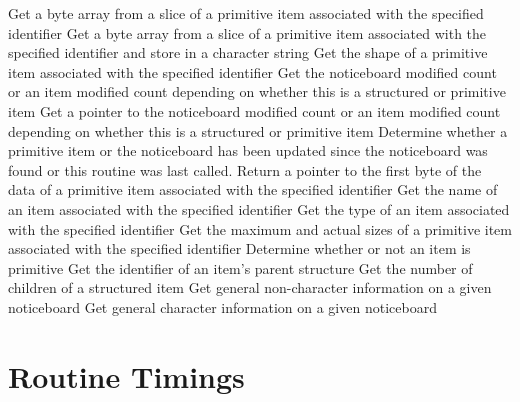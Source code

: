 \begin{mansectionroutines}
      Get a byte array from a slice of a primitive item
      associated with the specified identifier
      Get a byte array from a slice of a primitive item
      associated with the specified identifier and
      store in a character string
      Get the shape of a primitive item
      associated with the specified identifier
      Get the noticeboard modified count or an item modified count
      depending on whether this is a structured or primitive item
      Get a pointer to the noticeboard modified count or an item modified count
      depending on whether this is a structured or primitive item
      Determine whether a primitive item or the noticeboard has been updated
      since the noticeboard was found or this routine was last called.
      Return a pointer to the first byte of the data of a primitive item
      associated with the specified identifier
      Get the name of an item
      associated with the specified identifier
      Get the type of an item
      associated with the specified identifier
      Get the maximum and actual sizes of a primitive item
      associated with the specified identifier
      Determine whether or not an item is primitive
      Get the identifier of an item's parent structure
      Get the number of children of a structured item
      Get general non-character information on a given noticeboard
      Get general character information on a given noticeboard
\end{mansectionroutines}

\section {Routine Timings}
\label {Routine Timings}

